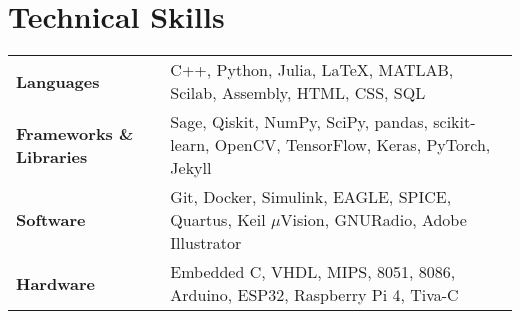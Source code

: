 \documentclass[10pt,a4paper,sans]{moderncv}        %
\begin{document}
\section{Technical Skills}
\begin{tabular}{p{1.5in}p{5.5in}}
\textbf{Languages}& C++, Python, Julia, \LaTeX, MATLAB, Scilab, Assembly, HTML, CSS,  SQL\\
\textbf{Frameworks \& Libraries}& Sage, Qiskit, NumPy, SciPy, pandas, scikit-learn, OpenCV, TensorFlow, Keras, PyTorch, Jekyll\\%
\textbf{Software}& Git, Docker, Simulink, EAGLE, SPICE, Quartus, Keil $\mu$Vision, GNURadio, Adobe Illustrator\\%
\textbf{Hardware}& Embedded C, VHDL, MIPS, 8051, 8086, Arduino, ESP32, Raspberry Pi 4, Tiva-C%
\end{tabular}
\setlength\tabcolsep{0.05em}
\end{document}
